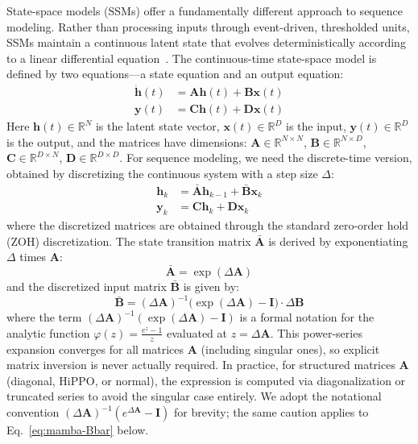 \documentclass[12pt,a4paper]{article}
\newcommand{\R}{\mathbb{R}}
\renewcommand{\vec}[1]{\mathbf{#1}}
\begin{document}
State-space models (SSMs) offer a fundamentally different approach to sequence modeling. Rather than processing inputs through event-driven, thresholded units, SSMs maintain a continuous latent state that evolves deterministically according to a linear differential equation~\cite{kalman1960,gu2021efficiently}. The continuous-time state-space model is defined by two equations---a state equation and an output equation:
\begin{align}
\dot{\vec{h}}(t) &= \mathbf{A} \vec{h}(t) + \mathbf{B} \vec{x}(t) \label{eq:ssm-cont-state} \\
\vec{y}(t) &= \mathbf{C} \vec{h}(t) + \mathbf{D} \vec{x}(t) \label{eq:ssm-cont-out}
\end{align}
Here $\vec{h}(t) \in \R^N$ is the latent state vector, $\vec{x}(t) \in \R^D$ is the input, $\vec{y}(t) \in \R^D$ is the output, and the matrices have dimensions: $\mathbf{A} \in \R^{N \times N}$, $\mathbf{B} \in \R^{N \times D}$, $\mathbf{C} \in \R^{D \times N}$, $\mathbf{D} \in \R^{D \times D}$. For sequence modeling, we need the discrete-time version, obtained by discretizing the continuous system with a step size $\Delta$:
\begin{align}
\vec{h}_k &= \bar{\mathbf{A}} \vec{h}_{k-1} + \bar{\mathbf{B}} \vec{x}_k \label{eq:ssm-disc-state} \\
\vec{y}_k &= \mathbf{C} \vec{h}_k + \mathbf{D} \vec{x}_k \label{eq:ssm-disc-out}
\end{align}
where the discretized matrices are obtained through the standard zero-order hold (ZOH) discretization. The state transition matrix $\bar{\mathbf{A}}$ is derived by exponentiating $\Delta$ times $\mathbf{A}$:
\begin{equation}
\bar{\mathbf{A}} = \exp(\Delta \mathbf{A}) \label{eq:ssm-Abar}
\end{equation}
and the discretized input matrix $\bar{\mathbf{B}}$ is given by:
\begin{equation}
\bar{\mathbf{B}} = (\Delta \mathbf{A})^{-1} \bigl(\exp(\Delta \mathbf{A}) - \mathbf{I}\bigr) \cdot \Delta \mathbf{B} \label{eq:ssm-Bbar}
\end{equation}
where the term $(\Delta \mathbf{A})^{-1}(\exp(\Delta \mathbf{A}) - \mathbf{I})$ is a formal notation for the analytic function $\varphi(z) = \frac{e^z - 1}{z}$ evaluated at $z = \Delta \mathbf{A}$. This power-series expansion converges for all matrices $\mathbf{A}$ (including singular ones), so explicit matrix inversion is never actually required. In practice, for structured matrices $\mathbf{A}$ (diagonal, HiPPO, or normal), the expression is computed via diagonalization or truncated series to avoid the singular case entirely. We adopt the notational convention $(\Delta \mathbf{A})^{-1}(e^{\Delta \mathbf{A}} - \mathbf{I})$ for brevity; the same caution applies to Eq.~\eqref{eq:mamba-Bbar} below.
\end{document}
